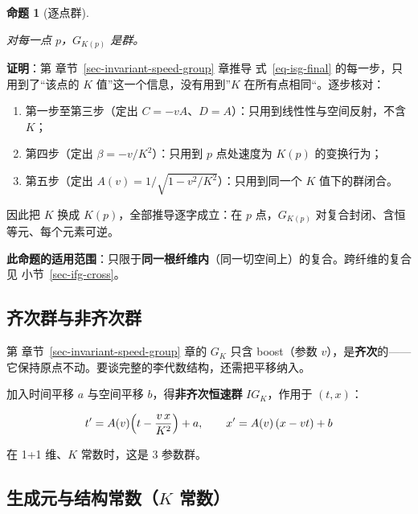 \documentclass[
  chinese,
  a4paper,
  UTF8,
  12pt,
  oneside,
  openany]{ctexbook}
\providecommand{\tightlist}{%
  \setlength{\itemsep}{0pt}\setlength{\parskip}{0pt}}
\theoremstyle{plain}
\theoremstyle{plain}
\theoremstyle{plain}
\newtheorem{proposition}{命题}[chapter]
\theoremstyle{definition}
\theoremstyle{plain}
\theoremstyle{plain}
\theoremstyle{remark}
\begin{document}
\begin{proposition}[逐点群]\protect\hypertarget{prp-ifg-fiber}{}\label{prp-ifg-fiber}

对每一点 \(p\)，\(G_{K(p)}\) 是群。

\end{proposition}

\textbf{证明}：第 章节~\ref{sec-invariant-speed-group} 章推导
式~\ref{eq-isg-final} 的每一步，只用到了``该点的 \(K\)
值''这一个信息，没有用到''\(K\) 在所有点相同``。逐步核对：

\begin{enumerate}
\def\labelenumi{\arabic{enumi}.}
\tightlist
\item
  第一步至第三步（定出
  \(C=-vA\)、\(D=A\)）：只用到线性性与空间反射，不含 \(K\)；
\item
  第四步（定出 \(\beta=-v/K^{2}\)）：只用到 \(p\) 点处速度为 \(K(p)\)
  的变换行为；
\item
  第五步（定出 \(A(v)=1/\sqrt{1-v^{2}/K^{2}}\)）：只用到同一个 \(K\)
  值下的群闭合。
\end{enumerate}

因此把 \(K\) 换成 \(K(p)\)，全部推导逐字成立：在 \(p\) 点，\(G_{K(p)}\)
对复合封闭、含恒等元、每个元素可逆。

\textbf{此命题的适用范围}：只限于\textbf{同一根纤维内}（同一切空间上）的复合。跨纤维的复合见
小节~\ref{sec-ifg-cross}。

\subsection{齐次群与非齐次群}\label{ux9f50ux6b21ux7fa4ux4e0eux975eux9f50ux6b21ux7fa4}

第 章节~\ref{sec-invariant-speed-group} 章的 \(G_K\) 只含 boost（参数
\(v\)），是\textbf{齐次}的------它保持原点不动。要谈完整的李代数结构，还需把平移纳入。

加入时间平移 \(a\) 与空间平移 \(b\)，得\textbf{非齐次恒速群}
\(IG_K\)，作用于 \((t,x)\)：

\[
t'=A(v)\Bigl(t-\frac{v\,x}{K^{2}}\Bigr)+a,\qquad
x'=A(v)\,(x-vt)+b
\]

在 1+1 维、\(K\) 常数时，这是 \(3\) 参数群。

\subsection{\texorpdfstring{生成元与结构常数（\(K\)
常数）}{生成元与结构常数（K 常数）}}\label{ux751fux6210ux5143ux4e0eux7ed3ux6784ux5e38ux6570k-ux5e38ux6570}
\end{document}
